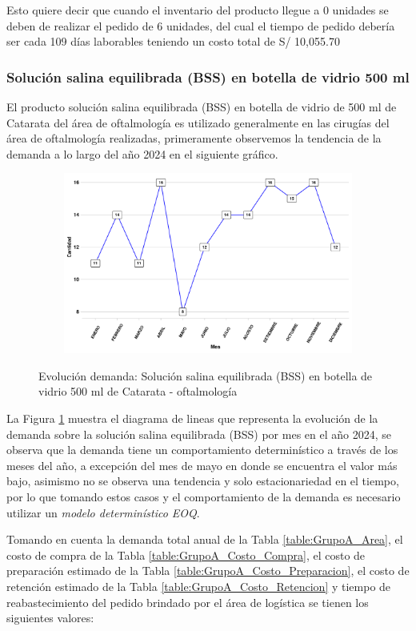 Esto quiere decir que cuando el inventario del producto llegue a 0 unidades se deben de realizar el pedido de 6 unidades, del cual el tiempo de pedido debería ser cada 109 días laborables teniendo un costo total de S/ 10,055.70
\subsubsection{Solución salina equilibrada (BSS) en botella de vidrio 500 ml}

El producto solución salina equilibrada (BSS) en botella de vidrio de 500 ml de Catarata del área de oftalmología es utilizado generalmente en las cirugías del área de oftalmología realizadas, primeramente observemos la tendencia de la demanda a lo largo del año 2024 en el siguiente gráfico.

\begin{figure}[H]
  \caption{Evolución demanda: Solución salina equilibrada (BSS) en botella de vidrio 500 ml de Catarata - oftalmología}
  {\includegraphics[width=15cm, height=5.95cm]{images/PROD015_demanda.pdf}}
  \label{fig:PROD015_demanda}
\end{figure}

La Figura \ref{fig:PROD015_demanda} muestra el diagrama de lineas que representa la evolución de la demanda sobre la solución salina equilibrada (BSS) por mes en el año 2024, se observa que la demanda tiene un comportamiento determinístico a través de los meses del año, a excepción del mes de mayo en donde se encuentra el valor más bajo, asimismo no se observa una tendencia y solo estacionariedad en el tiempo, por lo que tomando estos casos y el comportamiento de la demanda es necesario utilizar un \textsl{modelo determinístico EOQ}.

Tomando en cuenta la demanda total anual de la Tabla \ref{table:GrupoA_Area}, el costo de compra de la Tabla \ref{table:GrupoA_Costo_Compra}, el costo de preparación estimado de la Tabla \ref{table:GrupoA_Costo_Preparacion}, el costo de retención estimado de la Tabla \ref{table:GrupoA_Costo_Retencion} y tiempo de reabastecimiento del pedido brindado por el área de logística se tienen los siguientes valores:

